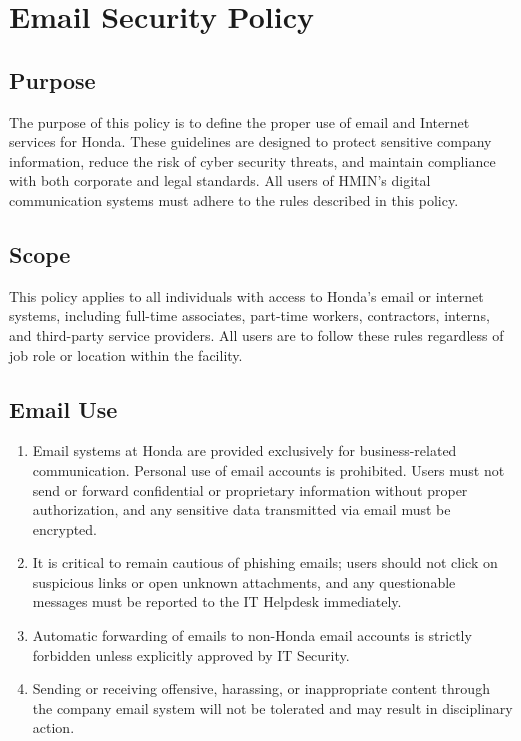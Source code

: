 \chapter{Email Security Policy}
\pagestyle{fancy}

\fancyhf{}

\fancyfoot[C]{\thepage}

\renewcommand{\headrulewidth}{0pt}
\renewcommand{\footrulewidth}{0pt}

\section{Purpose}

The purpose of this policy is to define the proper use of email and Internet services for Honda. These guidelines are designed to protect sensitive company information, reduce the risk of cyber security threats, and maintain compliance with both corporate and legal standards. All users of HMIN’s digital communication systems must adhere to the rules described in this policy.

\section{Scope}

This policy applies to all individuals with access to Honda's email or internet systems, including full-time associates, part-time workers, contractors, interns, and third-party service providers. All users are to follow these rules regardless of job role or location within the facility.

\section{Email Use}

\begin{enumerate}
    \item \textbf{}Email systems at Honda are provided exclusively for business-related communication. Personal use of email accounts is prohibited. Users must not send or forward confidential or proprietary information without proper authorization, and any sensitive data transmitted via email must be encrypted.

    \item \textbf{}It is critical to remain cautious of phishing emails; users should not click on suspicious links or open unknown attachments, and any questionable messages must be reported to the IT Helpdesk immediately.

    \item \textbf{}Automatic forwarding of emails to non-Honda email accounts is strictly forbidden unless explicitly approved by IT Security.

    \item \textbf{}Sending or receiving offensive, harassing, or inappropriate content through the company email system will not be tolerated and may result in disciplinary action.
\end{enumerate}

